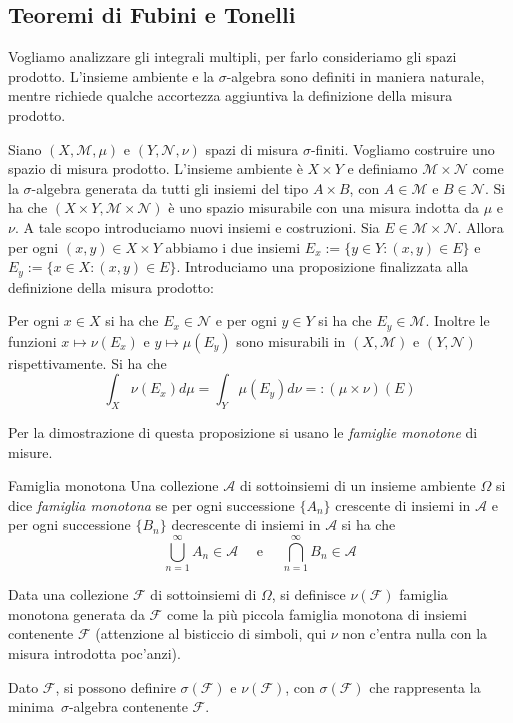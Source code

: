 \subsection{Teoremi di Fubini e Tonelli}
Vogliamo analizzare gli integrali multipli, per farlo consideriamo gli spazi
prodotto. L'insieme ambiente 
e la \(\sigma\)-algebra sono definiti in maniera naturale, mentre richiede qualche accortezza aggiuntiva
la definizione della misura prodotto. 

Siano \((X, \mathcal{M}, \mu)\) e \((Y, \mathcal{N}, \nu)\) spazi di misura
\(\sigma\)-finiti. Vogliamo costruire uno spazio di misura prodotto.
L'insieme ambiente è \(X \times Y\) e definiamo \(\mathcal{M} \times
\mathcal{N}\) come la \(\sigma\)-algebra generata da tutti gli insiemi del tipo
\(A \times B\), con \(A \in \mathcal{M}\) e \(B \in \mathcal{N}\). Si ha che
\((X \times Y, \mathcal{M} \times \mathcal{N})\) è uno spazio misurabile con una 
misura indotta da \(\mu\) e \(\nu\). A tale scopo introduciamo nuovi insiemi e
costruzioni.
Sia \(E \in \mathcal{M} \times \mathcal{N}\). Allora per ogni \((x,y) \in X
\times Y\) abbiamo i due insiemi  \(E_x := \{y \in Y : (x, y)
\in E\} \) e \(E_{y} := \{x \in X : (x, y) \in E\} \). Introduciamo una proposizione finalizzata alla 
definizione della misura prodotto: 
\begin{proposition}\label{prop:def_misura_prodotto}
    Per ogni \(x \in X\) si ha che \(E_x \in \mathcal{N}\) e per ogni \(y
    \in Y\) si ha che \(E_y \in \mathcal{M}\). Inoltre le funzioni \(x \mapsto
    \nu(E_x)\) e \(y \mapsto \mu(E_y)\) sono misurabili in \((X,
    \mathcal{M})\) e \((Y, \mathcal{N})\) rispettivamente. Si ha che
    \[
        \int_X \nu(E_x) d\mu = \int_Y \mu(E_y) d\nu =: (\mu \times \nu)(E)
    \]
\end{proposition}
Per la dimostrazione di questa proposizione si usano le \emph{famiglie
monotone} di misure.
\begin{definition}{Famiglia monotona}
Una collezione \(\mathcal{A}\) di sottoinsiemi di un
insieme ambiente \(\Omega\) si dice \emph{famiglia monotona} se per ogni
successione \(\{A_{n}\} \) crescente di insiemi in \(\mathcal{A}\) e per ogni
successione \(\{B_{n}\} \) decrescente di insiemi in \(\mathcal{A}\) si ha che
\[
    \bigcup_{n=1}^{\infty} A_{n} \in \mathcal{A} \quad \text{ e } \quad
    \bigcap_{n=1}^{\infty} B_{n} \in \mathcal{A}
\]
\end{definition}
Data una collezione \(\mathcal{F}\) di sottoinsiemi di \(\Omega\), si definisce
\(\nu(\mathcal{F})\) famiglia monotona generata da \(\mathcal{F}\) come la più
piccola famiglia monotona di insiemi contenente \(\mathcal{F}\) (attenzione al
bisticcio di simboli, qui \(\nu\) non c'entra nulla con la misura introdotta
poc'anzi). 
\begin{remark}
    Dato \(\mathcal{F}\), si possono definire \(\sigma(\mathcal{F})\) e
    \(\nu(\mathcal{F})\), con \(\sigma(\mathcal{F})\) che rappresenta la
    minima~\(\sigma\)-algebra contenente \(\mathcal{F}\).
\end{remark}

